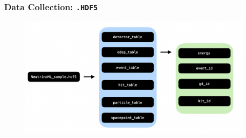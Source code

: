 \documentclass{beamer}
\begin{document}








\begin{frame}
	\frametitle{Data Collection: \texttt{.HDF5}}
	\begin{figure}[h!]
		\includegraphics[width=.8\textwidth]{images/hdf5.png}
	\end{figure}
\end{frame}
\end{document}
